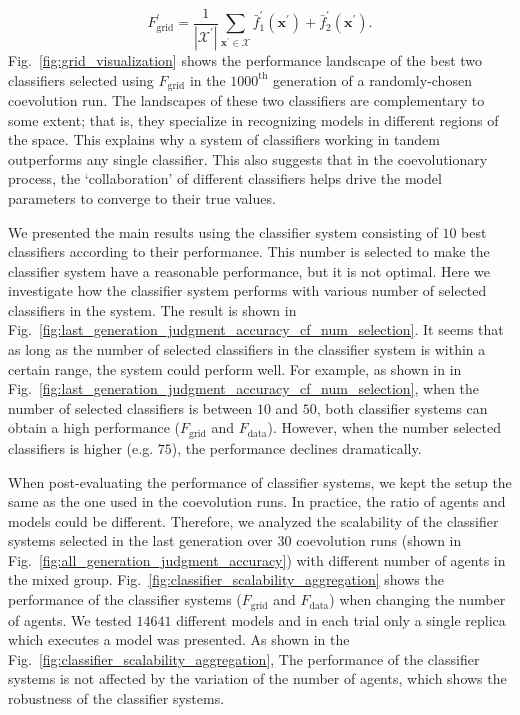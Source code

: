 %
\begin{equation}\label{classifier:performance_landscape}
F^{\prime}_{\textrm{grid}}=\frac{1}{|\mathcal{X}^\prime|} \sum_{\mathbf{x}^\prime\in \mathcal{X}} \bar{f}^\prime_1(\mathbf{x}^\prime) + \bar{f}^\prime_2(\mathbf{x}^\prime).
\end{equation}
%
Fig.~\ref{fig:grid_visualization} shows the performance landscape of the best two classifiers selected using $F_\textrm{grid}$ in the $1000^\textrm{th}$ generation of a randomly-chosen coevolution run. The landscapes of these two classifiers are complementary to some extent; that is, they specialize in recognizing models in different regions of the space. This explains why a system of classifiers working in tandem outperforms any single classifier. This also suggests that in the coevolutionary process, the `collaboration' of different classifiers helps drive the model parameters to converge to their true values. 

We presented the main results using the classifier system consisting of $10$ best classifiers according to their performance. This number is selected to make the classifier system have a reasonable performance, but it is not optimal. Here we investigate how the classifier system performs with various number of selected classifiers in the system. The result is shown in Fig.~\ref{fig:last_generation_judgment_accuracy_cf_num_selection}. It seems that as long as the number of selected classifiers in the classifier system is within a certain range, the system could perform well. For example, as shown in in Fig.~\ref{fig:last_generation_judgment_accuracy_cf_num_selection}, when the number of selected classifiers is between $10$ and $50$, both classifier systems can obtain a high performance ($F_\textrm{grid}$ and $F_\textrm{data}$). However, when the number selected classifiers is higher (e.g. $75$), the performance declines dramatically.

When post-evaluating the performance of classifier systems, we kept the setup the same as the one used in the coevolution runs. In practice, the ratio of agents and models could be different. Therefore, we analyzed the scalability of the classifier systems selected in the last generation over $30$ coevolution runs (shown in Fig.~\ref{fig:all_generation_judgment_accuracy}) with different number of agents in the mixed group. Fig.~\ref{fig:classifier_scalability_aggregation} shows the performance of the classifier systems ($F_\textrm{grid}$ and $F_\textrm{data}$) when changing the number of agents. We tested $14641$ different models and in each trial only a single replica which executes a model was presented. As shown in the Fig.~\ref{fig:classifier_scalability_aggregation}, The performance of the classifier systems is not affected by the variation of the number of agents, which shows the robustness of the classifier systems.

